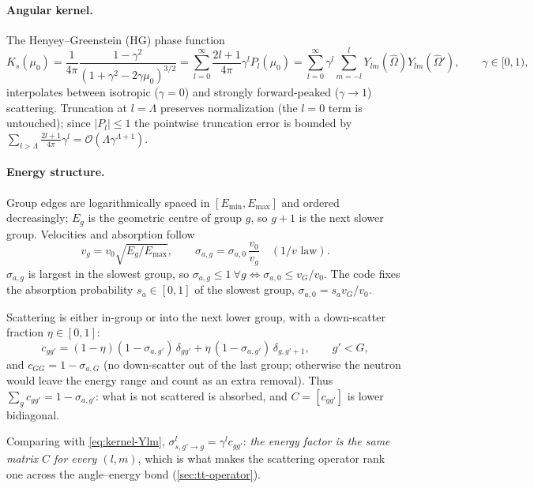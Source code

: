 \documentclass[11pt,a4paper]{article}
\numberwithin{equation}{section}
\theoremstyle{remark}
\newcommand{\Om}{\hat{\Omega}}
\newcommand{\Lmax}{\Lambda}
\begin{document}
\paragraph{Angular kernel.}
The Henyey--Greenstein (HG) phase function \cite{HenyeyGreenstein1941}
\begin{equation}
K_s(\mu_0)=\frac{1}{4\pi}\frac{1-\gamma^2}{(1+\gamma^2-2\gamma\mu_0)^{3/2}}
=\sum_{l=0}^{\infty}\frac{2l+1}{4\pi}\gamma^l P_l(\mu_0)
=\sum_{l=0}^{\infty}\gamma^l\sum_{m=-l}^{l}Y_{lm}(\Om)Y_{lm}(\Om'),\qquad\gamma\in[0,1),
\end{equation}
interpolates between isotropic ($\gamma=0$) and strongly forward-peaked ($\gamma\to1$) scattering. Truncation at $l=\Lmax$ preserves normalization (the $l=0$ term is untouched); since $|P_l|\le1$ the pointwise truncation error is bounded by $\sum_{l>\Lmax}\frac{2l+1}{4\pi}\gamma^l=\mathcal{O}(\Lmax\gamma^{\Lmax+1})$.

\paragraph{Energy structure.}
Group edges are logarithmically spaced in $[E_{\min},E_{\max}]$ and ordered decreasingly; $E_g$ is the geometric centre of group $g$, so $g+1$ is the next slower group. Velocities and absorption follow
\begin{equation}
v_g=v_0\sqrt{E_g/E_{\max}},\qquad \sigma_{a,g}=\sigma_{a,0}\,\frac{v_0}{v_g}\quad(1/v\text{ law}).
\end{equation}
$\sigma_{a,g}$ is largest in the slowest group, so $\sigma_{a,g}\le1\ \forall g\iff\sigma_{a,0}\le v_G/v_0$. The code fixes the absorption probability $s_a\in[0,1]$ of the slowest group, $\sigma_{a,0}=s_a v_G/v_0$.

Scattering is either in-group or into the next lower group, with a down-scatter fraction $\eta\in[0,1]$:
\begin{equation}
c_{gg'}=(1-\eta)(1-\sigma_{a,g'})\,\delta_{gg'}+\eta\,(1-\sigma_{a,g'})\,\delta_{g,g'+1},\qquad g'<G,
\end{equation}
and $c_{GG}=1-\sigma_{a,G}$ (no down-scatter out of the last group; otherwise the neutron would leave the energy range and count as an extra removal). Thus $\sum_g c_{gg'}=1-\sigma_{a,g'}$: what is not scattered is absorbed, and $C=[c_{gg'}]$ is lower bidiagonal.

Comparing with \eqref{eq:kernel-Ylm}, $\sigma^l_{s,g'\to g}=\gamma^l c_{gg'}$: \emph{the energy factor is the same matrix $C$ for every $(l,m)$}, which is what makes the scattering operator rank one across the angle--energy bond (\cref{sec:tt-operator}).
\end{document}
